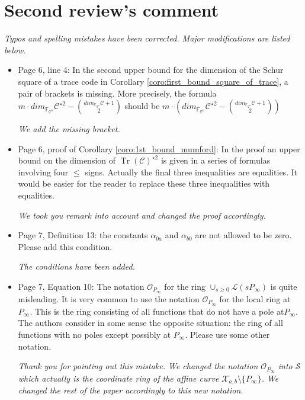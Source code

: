 \documentclass[12pt,a4paper]{amsart}
\DeclareMathOperator{\trace}{Tr}
\newcommand{\fqm}{\mathbb{F}_{q^m}}
\newcommand{\calC}{\mathcal{C}}
\newcommand{\calX}{\mathcal{X}}
\newcommand{\Tr}[1]{\trace\!\left(#1\right)}
\begin{document}
\section*{Second review's comment}

\textit{Typos and spelling mistakes have been corrected. Major modifications are listed below.} \\

\begin{itemize}

\item Page 6, line 4: In the second upper bound for the dimension of the Schur square of a trace code in Corollary \ref{coro:first_bound_square_of_trace}, a pair of brackets is missing. More precisely, the formula $m \cdot dim_{\fqm} \calC^{\star 2}-\binom{dim_{\fqm}\calC+1}{2}$ should be $m \cdot \left( dim_{\fqm} \calC^{\star 2} -\binom{dim_{\fqm} \calC+1}{2}\right)$

\textit{We add the missing bracket.}

\item Page 6, proof of Corollary \ref{coro:1st_bound_mumford}: In the proof an upper bound on the dimension of $\Tr{\calC}^{\star 2}$ is given in a series of formulas involving four $\le$ signs. Actually the final three inequalities are equalities. It would be easier for the reader to replace these three inequalities with equalities.

\textit{We took you remark into account and changed the proof accordingly.}


\item Page 7, Definition 13: the constants $\alpha_{0a}$ and $\alpha_{b0}$ are not allowed to be zero. Please add this condition.

\textit{The conditions have been added.} 

\item Page 7, Equation 10: The notation $\mathcal{O}_{P_\infty}$ for the ring $\cup_{s \ge 0} \mathcal{L}(sP_\infty)$ is quite misleading. It is very common to use the notation $\mathcal{O}_{P_\infty}$ for the local ring at $P_\infty$. This is the ring consisting of all functions that do not have a pole at$ P_\infty$. The authors consider in some sense the opposite situation: the ring of all functions with no poles except possibly at $P_\infty$. Please use some other notation.

\textit{Thank you for pointing out this mistake. We changed the notation $\mathcal{O}_{P_\infty}$ into $\mathcal{S}$ which actually is the coordinate ring of the affine curve $\calX_{a,b} \setminus \{P_\infty\}$. We changed the rest of the paper accordingly to this new notation.}


\end{itemize}
\end{document}

